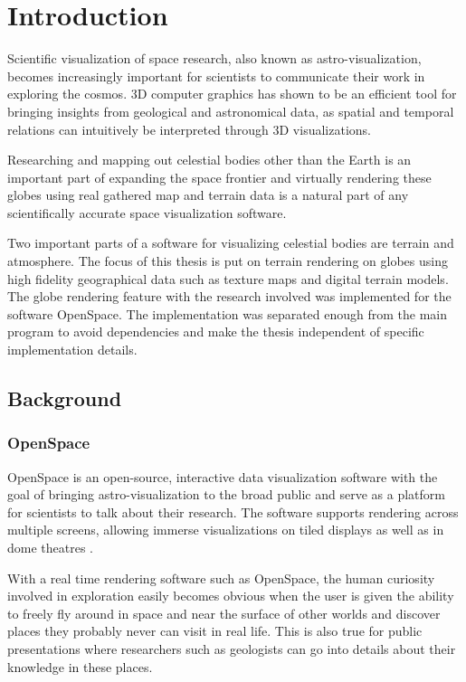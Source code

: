 \chapter{Introduction}

Scientific visualization of space research, also known as astro-visualization, becomes increasingly important for scientists to communicate their work in exploring the cosmos. 3D computer graphics has shown to be an efficient tool for bringing insights from geological and astronomical data, as spatial and temporal relations can intuitively be interpreted through 3D visualizations.

Researching and mapping out celestial bodies other than the Earth is an important part of expanding the space frontier and virtually rendering these globes using real gathered map and terrain data is a natural part of any scientifically accurate space visualization software.

Two important parts of a software for visualizing celestial bodies are terrain and atmosphere. The focus of this thesis is put on terrain rendering on globes using high fidelity geographical data such as texture maps and digital terrain models. The globe rendering feature with the research involved was implemented for the software OpenSpace. The implementation was separated enough from the main program to avoid dependencies and make the thesis independent of specific implementation details. 

\section{Background}

\subsection{OpenSpace}

OpenSpace is an open-source, interactive data visualization software with the goal of bringing astro-visualization to the broad public and serve as a platform for scientists to talk about their research. The software supports rendering across multiple screens, allowing immerse visualizations on tiled displays as well as in dome theatres \cite{openspace}.

With a real time rendering software such as OpenSpace, the human curiosity involved in exploration easily becomes obvious when the user is given the ability to freely fly around in space and near the surface of other worlds and discover places they probably never can visit in real life. This is also true for public presentations where researchers such as geologists can go into details about their knowledge in these places.

